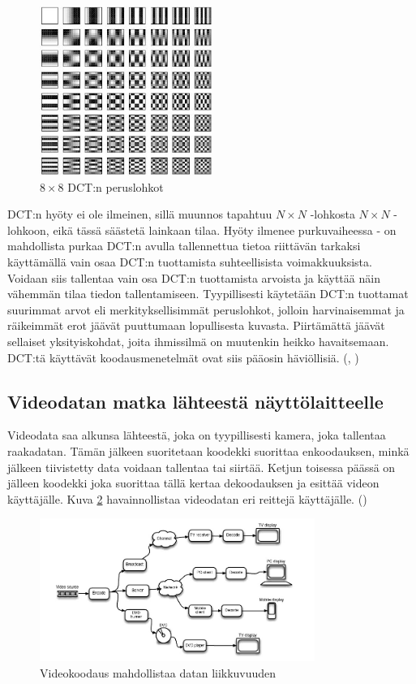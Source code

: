 \begin{figure}[ht]
	\centering
	\includegraphics[width=0.5\textwidth]{dct.jpg}
	\caption{$8 \times 8$ DCT:n peruslohkot}
	\label{fig:dct}
\end{figure}

DCT:n hyöty ei ole ilmeinen, sillä muunnos tapahtuu $N \times N$ -lohkosta
$N \times N$ -lohkoon, eikä tässä säästetä lainkaan  tilaa. Hyöty ilmenee
purkuvaiheessa - on mahdollista purkaa DCT:n avulla tallennettua tietoa
riittävän tarkaksi käyttämällä vain osaa DCT:n tuottamista suhteellisista
voimakkuuksista. Voidaan siis tallentaa vain osa DCT:n tuottamista arvoista
ja käyttää näin vähemmän tilaa tiedon tallentamiseen. Tyypillisesti käytetään
DCT:n tuottamat suurimmat arvot eli merkityksellisimmät peruslohkot, jolloin
harvinaisemmat ja räikeimmät erot jäävät puuttumaan lopullisesta kuvasta.
Piirtämättä jäävät sellaiset yksityiskohdat, joita ihmissilmä on muutenkin
heikko havaitsemaan. DCT:tä käyttävät koodausmenetelmät ovat siis pääosin
häviöllisiä. (\citealt{h264}, \citealt{du})

\subsection{Videodatan matka lähteestä näyttölaitteelle}

Videodata saa alkunsa lähteestä, joka on tyypillisesti kamera, joka tallentaa
raakadatan. Tämän jälkeen suoritetaan koodekki suorittaa enkoodauksen, minkä
jälkeen tiivistetty data voidaan tallentaa tai siirtää. Ketjun toisessa
päässä on jälleen koodekki joka suorittaa tällä kertaa dekoodauksen ja esittää
videon käyttäjälle. Kuva \ref{fig:codec} havainnollistaa videodatan eri reittejä
käyttäjälle. (\citealt{h264})

\begin{figure}[ht]
	\centering
	\includegraphics[width=0.8\textwidth]{codec.jpg}
	\caption{Videokoodaus mahdollistaa datan liikkuvuuden}
	\label{fig:codec}
\end{figure}

